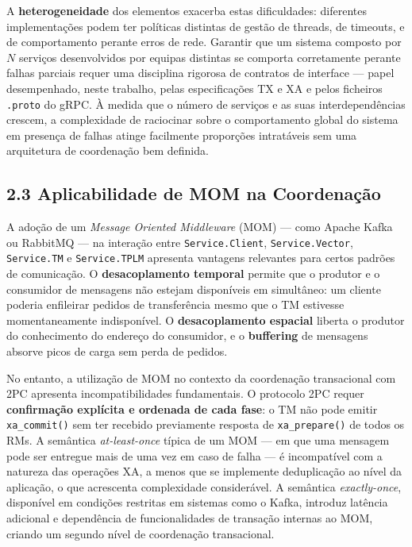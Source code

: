 A \textbf{heterogeneidade} dos elementos exacerba estas dificuldades: diferentes implementações
podem ter políticas distintas de gestão de threads, de timeouts, e de comportamento perante erros
de rede. Garantir que um sistema composto por $N$ serviços desenvolvidos por equipas distintas se
comporta corretamente perante falhas parciais requer uma disciplina rigorosa de contratos de
interface — papel desempenhado, neste trabalho, pelas especificações TX e XA e pelos ficheiros
\texttt{.proto} do gRPC. À medida que o número de serviços e as suas interdependências crescem,
a complexidade de raciocinar sobre o comportamento global do sistema em presença de falhas atinge
facilmente proporções intratáveis sem uma arquitetura de coordenação bem definida.

\subsection*{2.3 Aplicabilidade de MOM na Coordenação}

A adoção de um \textit{Message Oriented Middleware} (MOM) --- como Apache Kafka ou RabbitMQ ---
na interação entre \texttt{Service.Client}, \texttt{Service.Vector}, \texttt{Service.TM} e
\texttt{Service.TPLM} apresenta vantagens relevantes para certos padrões de comunicação. O
\textbf{desacoplamento temporal} permite que o produtor e o consumidor de mensagens não estejam
disponíveis em simultâneo: um cliente poderia enfileirar pedidos de transferência mesmo que o TM
estivesse momentaneamente indisponível. O \textbf{desacoplamento espacial} liberta o produtor do
conhecimento do endereço do consumidor, e o \textbf{buffering} de mensagens absorve picos de
carga sem perda de pedidos.

No entanto, a utilização de MOM no contexto da coordenação transacional com 2PC apresenta
incompatibilidades fundamentais. O protocolo 2PC requer \textbf{confirmação explícita e ordenada
de cada fase}: o TM não pode emitir \texttt{xa\_commit()} sem ter recebido previamente resposta
de \texttt{xa\_prepare()} de todos os RMs. A semântica \textit{at-least-once} típica de um MOM
--- em que uma mensagem pode ser entregue mais de uma vez em caso de falha --- é incompatível
com a natureza das operações XA, a menos que se implemente deduplicação ao nível da aplicação,
o que acrescenta complexidade considerável. A semântica \textit{exactly-once}, disponível em
condições restritas em sistemas como o Kafka, introduz latência adicional e dependência de
funcionalidades de transação internas ao MOM, criando um segundo nível de coordenação transacional.

